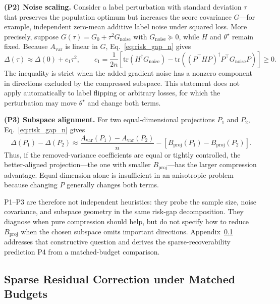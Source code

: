 \textbf{(P2) Noise scaling.}
Consider a label perturbation with standard deviation $\tau$ that preserves the population optimum but increases the score covariance $G$---for example, independent zero-mean additive label noise under squared loss.
More precisely, suppose $G(\tau)=G_0+\tau^2G_{\mathrm{noise}}$ with $G_{\mathrm{noise}}\succeq0$, while $H$ and $\theta^\star$ remain fixed.
Because $A_{\mathrm{var}}$ is linear in $G$, Eq.~\eqref{eq:risk_gap_n} gives
\begin{equation}
\Delta(\tau)
\approx
\Delta(0)+c_1\tau^2,
\qquad
c_1
=
\frac{1}{2n}
\left[
\mathrm{tr}(H^\dagger G_{\mathrm{noise}})
-
\mathrm{tr}\!\left(
(P^\top HP)^\dagger P^\top G_{\mathrm{noise}}P
\right)
\right]
\ge0.
\label{eq:noise_scaling_prediction}
\end{equation}
The inequality is strict when the added gradient noise has a nonzero component in directions excluded by the compressed subspace.
This statement does not apply automatically to label flipping or arbitrary losses, for which the perturbation may move $\theta^\star$ and change both terms.

\textbf{(P3) Subspace alignment.}
For two equal-dimensional projections $P_1$ and $P_2$, Eq.~\eqref{eq:risk_gap_n} gives
\begin{equation}
\Delta(P_1)-\Delta(P_2)
\approx
\frac{A_{\mathrm{var}}(P_1)-A_{\mathrm{var}}(P_2)}{n}
-
\left[
B_{\mathrm{proj}}(P_1)-B_{\mathrm{proj}}(P_2)
\right].
\label{eq:subspace_alignment_prediction}
\end{equation}
Thus, if the removed-variance coefficients are equal or tightly controlled, the better-aligned projection---the one with smaller $B_{\mathrm{proj}}$---has the larger compression advantage.
Equal dimension alone is insufficient in an anisotropic problem because changing $P$ generally changes both terms.

P1--P3 are therefore not independent heuristics: they probe the sample size, noise covariance, and subspace geometry in the same risk-gap decomposition.
They diagnose when pure compression should help, but do not specify how to reduce $B_{\mathrm{proj}}$ when the chosen subspace omits important directions.
Appendix~\ref{sec:sparse_bias} addresses that constructive question and derives the sparse-recoverability prediction P4 from a matched-budget comparison.


\subsection{Sparse Residual Correction under Matched Budgets}
\label{sec:sparse_bias}

